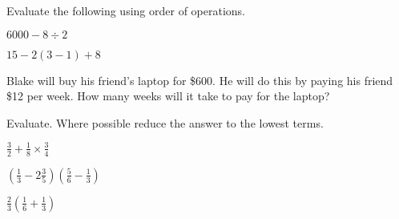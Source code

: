 \documentclass[12pt,letterpaper]{orulawork}
\begin{document}


\begin{question}{6}
Evaluate the following using order of operations.
\begin{exercises}
\item $6000 - 8 \div 2$
\item $15 - 2 ( 3 - 1) + 8$
\end{exercises}
\end{question}

\begin{question}{1}
Blake will buy his friend's laptop for \$600. He will do this by paying his friend \$12 per week. How many weeks will it take to pay for the laptop?
\end{question}

\begin{question}{3}
Evaluate. Where possible reduce the answer to the lowest terms.
\begin{exercises}
\item $\frac{3}{2}+\frac{1}{8} \times \frac{3}{4}$
\item $(\frac{1}{3}-2\frac{3}{5})(\frac{5}{6}-\frac{1}{3})$
\item $\frac{2}{3}(\frac{1}{6}+\frac{1}{3})$
\end{exercises}
\end{question}

\end{document}
